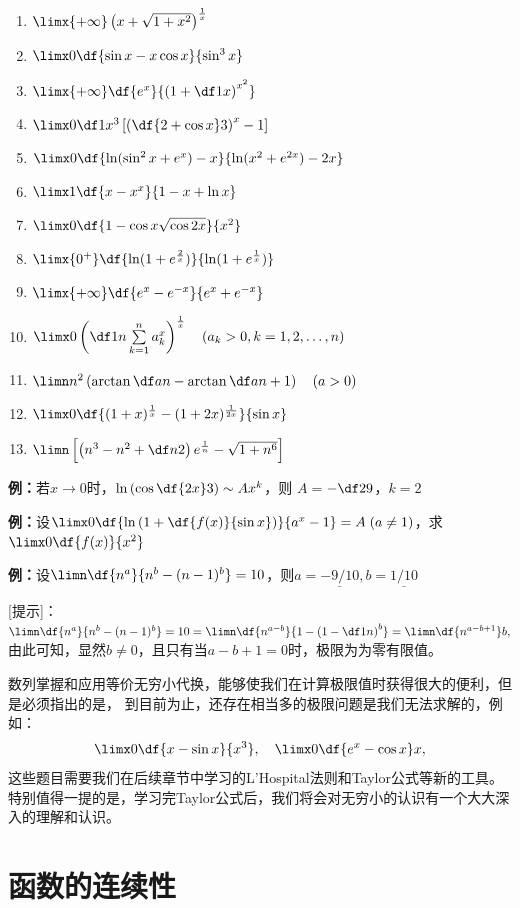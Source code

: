 \begin{enumerate}[(1)]
  \item $\limx{+\infty}\left(x+\sqrt{1+x^2}\right)^{\frac1x}$
  \item $\limx0\df{\sin x-x\cos x}{\sin^3x}$
  \item $\limx{+\infty}\df{e^x}{\left(1+\df1x\right)^{x^2}}$
  \item $\limx0\df1{x^3}\left[\left(\df{2+\cos x}3\right)^x-1\right]$
  \item $\limx0\df{\ln(\sin^2x+e^x)-x}{\ln(x^2+e^{2x})-2x}$
  \item $\limx1\df{x-x^x}{1-x+\ln x}$
  \item $\limx0\df{1-\cos x\sqrt{\cos2x}}{x^2}$
  \item $\limx{0^+}\df{\ln(1+e^{\frac2x})}{\ln(1+e^{\frac1x})}$
  \item $\limx{+\infty}\df{e^x-e^{-x}}{e^x+e^{-x}}$
  \item $\limx0\left(\df1n\sum\limits_{k=1}^na_k^x\right)^{\frac1x}
  \quad (a_k>0,k=1,2,\ldots,n)$
  \item $\limn n^2\left(\arctan\df an-\arctan\df a{n+1}\right)\quad (a>0)$
  \item $\limx0\df{(1+x)^{\frac1x}-(1+2x)^{\frac1{2x}}}{\sin x}$
  \item $\limn\left[\left(n^3-n^2+\df n2\right)e^{\frac1n}-\sqrt{1+n^6}\right]$
\end{enumerate}

{\bf 例：}若$x\to 0$时，$\ln\left(\cos\df{2x}3\right)\sim Ax^k$，则
$A=$\underline{$-\df29$}，$k=$\underline{$2$}

{\bf 例：}设$\limx0\df{\ln\left(1+\df{f(x)}{\sin x}\right)}{a^x-1}=A\;(a\ne 1)$，求
$\limx0\df{f(x)}{x^2}$

{\bf 例：}设$\limn\df{n^a}{n^b-(n-1)^b}=10$，则$a=\underline{-9/10},
b=\underline{1/10}$

[提示]：
$\limn\df{n^a}{n^b-(n-1)^b}=10=\limn\df{n^{a-b}}{1-\left(1-\df1n\right)^b}
=\limn\df{n^{a-b+1}}b,$
由此可知，显然$b\ne 0$，且只有当$a-b+1=0$时，极限为为零有限值。

数列掌握和应用等价无穷小代换，能够使我们在计算极限值时获得很大的便利，但是必须指出的是，
到目前为止，还存在相当多的极限问题是我们无法求解的，例如：
$$\limx0\df{x-\sin x}{x^3},
\quad\limx0\df{e^x-\cos x}x,$$
这些题目需要我们在后续章节中学习的L'Hospital法则和Taylor公式等新的工具。
特别值得一提的是，学习完Taylor公式后，我们将会对无穷小的认识有一个大大深入的理解和认识。

\section{函数的连续性}

